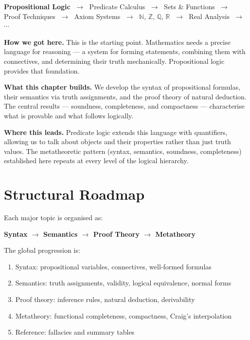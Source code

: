 \begin{tcolorbox}[
  colback=gray!6,
  colframe=gray!40,
  arc=2pt,
  left=8pt, right=8pt, top=6pt, bottom=6pt,
  title={\small\textbf{Where You Are in the Journey}},
  fonttitle=\small\bfseries
]
\begin{center}
\small
\textbf{Propositional Logic}
$\;\to\;$ Predicate Calculus
$\;\to\;$ Sets \& Functions
$\;\to\;$ Proof Techniques
$\;\to\;$ Axiom Systems
$\;\to\;$ $\mathbb{N}$, $\mathbb{Z}$, $\mathbb{Q}$, $\mathbb{R}$
$\;\to\;$ Real Analysis
$\;\to\;$ $\cdots$
\end{center}

\medskip
\noindent\textbf{How we got here.}
This is the starting point. Mathematics needs a precise language for
reasoning --- a system for forming statements, combining them with
connectives, and determining their truth mechanically.
Propositional logic provides that foundation.

\medskip
\noindent\textbf{What this chapter builds.}
We develop the syntax of propositional formulas, their semantics via
truth assignments, and the proof theory of natural deduction.
The central results --- soundness, completeness, and compactness ---
characterise what is provable and what follows logically.

\medskip
\noindent\textbf{Where this leads.}
Predicate logic extends this language with quantifiers, allowing us to
talk about objects and their properties rather than just truth values.
The metatheoretic pattern (syntax, semantics, soundness, completeness)
established here repeats at every level of the logical hierarchy.
\end{tcolorbox}
\vspace{1em}

\section*{Structural Roadmap}

Each major topic is organised as:
\begin{center}
\textbf{Syntax $\longrightarrow$ Semantics
$\longrightarrow$ Proof Theory $\longrightarrow$ Metatheory}
\end{center}

The global progression is:
\begin{enumerate}
  \item Syntax: propositional variables, connectives, well-formed formulas
  \item Semantics: truth assignments, validity, logical equivalence, normal forms
  \item Proof theory: inference rules, natural deduction, derivability
  \item Metatheory: functional completeness, compactness, Craig's interpolation
  \item Reference: fallacies and summary tables
\end{enumerate}

